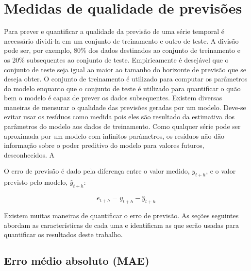 \documentclass[
	12pt,				%
	openright,			%
	oneside,			%
	a4paper,			%
	english,			%
	french,				%
	spanish,			%
	brazil				%
	]{abntex2}
\begin{document}


\section{Medidas de qualidade de previsões}

Para prever e quantificar a qualidade da previsão de uma série temporal é necessário dividi-la em um conjunto de treinamento e outro de teste. A divisão pode ser, por exemplo, 80\% dos dados destinados ao conjunto de treinamento e os 20\% subsequentes ao conjunto de teste. Empiricamente é desejável que o conjunto de teste seja igual ao maior ao tamanho do horizonte de previsão que se deseja obter. O conjunto de treinamento é utilizado para computar os parâmetros do modelo enquanto que o conjunto de teste é utilizado para quantificar o quão bem o modelo é capaz de prever os dados subsequentes.
Existem diversas maneiras de mensurar o qualidade das previsões geradas por um modelo. Deve-se evitar usar os resíduos como medida pois eles são resultado da estimativa dos parâmetros do modelo aos dados de treinamento. Como qualquer série pode ser aproximada por um modelo com infinitos parâmetros, os resíduos não dão informação sobre o poder preditivo do modelo para valores futuros, desconhecidos. A


O erro de previsão é dado pela diferença entre o valor medido, $y_{t+h}$, e o valor previsto pelo modelo, $\hat{y}_{t+h}$:

$$e_{t+h} = y_{t+h} - \hat{y}_{t+h}$$

Existem muitas maneiras de quantificar o erro de previsão. As seções seguintes abordam as características de cada uma e identificam as que serão usadas para quantificar os resultados deste trabalho.

\subsection{Erro médio absoluto (MAE)}
\end{document}
